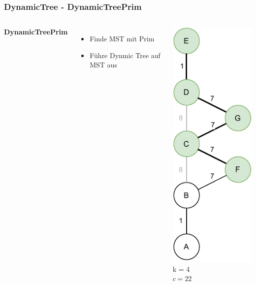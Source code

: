 \documentclass[aspectratio=169]{beamer}
\begin{document}
\begin{frame}
	\frametitle{DynamicTree - DynamicTreePrim}
	\begin{columns}[c] %
		
		\textbf{DynamicTreePrim}
		\begin{itemize}
			\item Finde MST mit Prim
			\item Führe Dynmic Tree auf MST aus
		\end{itemize}
		\includegraphics[scale=.6]{dynamic_prim.pdf}
		k = 4\\
		$c = 22$
		
		
	\end{columns}
	\end{frame}
	
\end{document}
